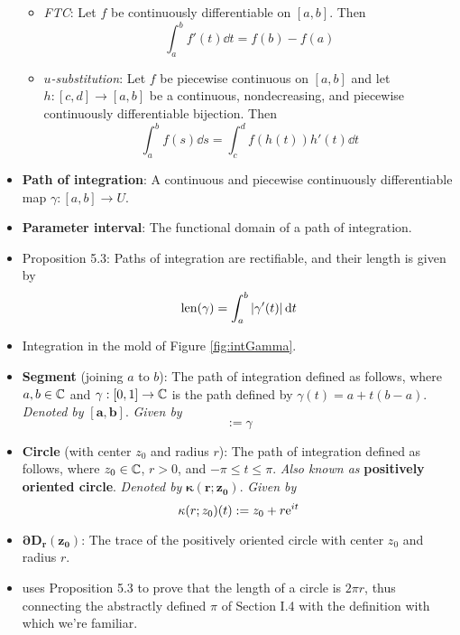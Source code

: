 \documentclass[../notes.tex]{subfiles}
\begin{document}
\begin{itemize}
\begin{itemize}
        \item \emph{FTC}: Let $f$ be continuously differentiable on $[a,b]$. Then
        \begin{equation*}
            \int_a^bf'(t)\dd{t} = f(b)-f(a)
        \end{equation*}
        \item \emph{$u$-substitution}: Let $f$ be piecewise continuous on $[a,b]$ and let $h:[c,d]\to[a,b]$ be a continuous, nondecreasing, and piecewise continuously differentiable bijection. Then
        \begin{equation*}
            \int_a^bf(s)\dd{s} = \int_c^df(h(t))h'(t)\dd{t}
        \end{equation*}
    \end{itemize}
    \item \textbf{Path of integration}: A continuous and piecewise continuously differentiable map $\gamma:[a,b]\to U$.
    \item \textbf{Parameter interval}: The functional domain of a path of integration.
    \item Proposition 5.3: Paths of integration are rectifiable, and their length is given by
    \begin{equation*}
        \len(\gamma) = \int_a^b|\gamma'(t)|\dd{t}
    \end{equation*}
    \item Integration in the mold of Figure \ref{fig:intGamma}.
    \item \textbf{Segment} (joining $a$ to $b$): The path of integration defined as follows, where $a,b\in\C$ and $\gamma:[0,1]\to\C$ is the path defined by $\gamma(t)=a+t(b-a)$. \emph{Denoted by} $\bm{[a,b]}$. \emph{Given by} 
    \begin{equation*}
        [a,b] := \gamma
    \end{equation*}
    \item \textbf{Circle} (with center $z_0$ and radius $r$): The path of integration defined as follows, where $z_0\in\C$, $r>0$, and $-\pi\leq t\leq\pi$. \emph{Also known as} \textbf{positively oriented circle}. \emph{Denoted by} $\bm{\kappa(r;z_0)}$. \emph{Given by}
    \begin{equation*}
        \kappa(r;z_0)(t) := z_0+r\e[it]
    \end{equation*}
    \item $\bm{\partial D_r(z_0)}$: The trace of the positively oriented circle with center $z_0$ and radius $r$.
    \item \textcite{bib:FischerLieb} uses Proposition 5.3 to prove that the length of a circle is $2\pi r$, thus connecting the abstractly defined $\pi$ of Section I.4 with the definition with which we're familiar.

\end{itemize}
\end{document}
